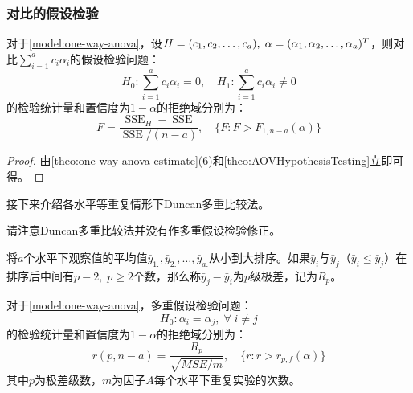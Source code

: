 \subsubsection{对比的假设检验}
\begin{theorem}
	对于\cref{model:one-way-anova}，设$H=(c_1, c_2, \dots, c_{a}),\;\alpha=(\alpha_1, \alpha_2, \dots, \alpha_{a})^T$，则对比$\sum\limits_{i=1}^{a}c_i\alpha_i$的假设检验问题：
	\begin{equation*}
		H_0:\sum_{i=1}^{a}c_i\alpha_i=0,\quad H_1:\sum_{i=1}^{a}c_i\alpha_i\ne0
	\end{equation*}
	的检验统计量和置信度为$1-\alpha$的拒绝域分别为：
	\begin{equation*}
		F=\frac{\operatorname{SSE}_H-\operatorname{SSE}}{\operatorname{SSE}/(n-a)},\quad\{F:F>F_{1,n-a}(\alpha)\}
	\end{equation*}
\end{theorem}
\begin{proof}
	由\cref{theo:one-way-anova-estimate}(6)和\cref{theo:AOVHypothesisTesting}立即可得。
\end{proof}
接下来介绍各水平等重复情形下Duncan多重比较法。
\begin{note}
	请注意Duncan多重比较法并没有作多重假设检验修正。
\end{note}
\begin{definition}
	将$a$个水平下观察值的平均值$\bar{y}_{1.},\bar{y}_{2.},\dots,\bar{y}_{a.}$从小到大排序。如果$\bar{y}_i$与$\bar{y}_j$（$\bar{y}_i\leqslant\bar{y}_j$）在排序后中间有$p-2,\;p\geqslant2$个数，那么称$\bar{y}_j-\bar{y}_i$为$p$级极差，记为$R_p$。
\end{definition}
\begin{theorem}
	对于\cref{model:one-way-anova}，多重假设检验问题：
	\begin{equation*}
	H_0:\alpha_i=\alpha_j,\;\forall\;i\ne j
	\end{equation*}
	的检验统计量和置信度为$1-\alpha$的拒绝域分别为：
	\begin{equation*}
		r(p,n-a)=\frac{R_p}{\sqrt{MSE/m}},\quad\{r:r>r_{p,f}(\alpha)\}
	\end{equation*}
	其中$p$为极差级数，$m$为因子$A$每个水平下重复实验的次数。
\end{theorem}
